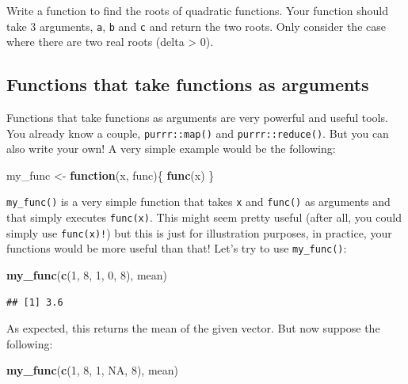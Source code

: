 \documentclass[]{gitbook}
\newenvironment{Shaded}{\begin{snugshade}}{\end{snugshade}}
\newcommand{\ControlFlowTok}[1]{\textcolor[rgb]{0.13,0.29,0.53}{\textbf{#1}}}
\newcommand{\DecValTok}[1]{\textcolor[rgb]{0.00,0.00,0.81}{#1}}
\newcommand{\KeywordTok}[1]{\textcolor[rgb]{0.13,0.29,0.53}{\textbf{#1}}}
\newcommand{\NormalTok}[1]{#1}
\newcommand{\OtherTok}[1]{\textcolor[rgb]{0.56,0.35,0.01}{#1}}
\newcommand{\StringTok}[1]{\textcolor[rgb]{0.31,0.60,0.02}{#1}}
\theoremstyle{definition}
\theoremstyle{definition}
\theoremstyle{definition}
\theoremstyle{remark}
\begin{document}
Write a function to find the roots of quadratic functions. Your function
should take 3 arguments, \texttt{a}, \texttt{b} and \texttt{c} and
return the two roots. Only consider the case where there are two real
roots (delta \textgreater{} 0).

\hypertarget{functions-that-take-functions-as-arguments}{%
\subsection{Functions that take functions as
arguments}\label{functions-that-take-functions-as-arguments}}

Functions that take functions as arguments are very powerful and useful
tools. You already know a couple, \texttt{purrr::map()} and
\texttt{purrr::reduce()}. But you can also write your own! A very simple
example would be the following:

\begin{Shaded}
\begin{Highlighting}[]
\NormalTok{my_func <-}\StringTok{ }\ControlFlowTok{function}\NormalTok{(x, func)\{}
  \KeywordTok{func}\NormalTok{(x)}
\NormalTok{\}}
\end{Highlighting}
\end{Shaded}

\texttt{my\_func()} is a very simple function that takes \texttt{x} and
\texttt{func()} as arguments and that simply executes \texttt{func(x)}.
This might seem pretty useful (after all, you could simply use
\texttt{func(x)!}) but this is just for illustration purposes, in
practice, your functions would be more useful than that! Let's try to
use \texttt{my\_func()}:

\begin{Shaded}
\begin{Highlighting}[]
\KeywordTok{my_func}\NormalTok{(}\KeywordTok{c}\NormalTok{(}\DecValTok{1}\NormalTok{, }\DecValTok{8}\NormalTok{, }\DecValTok{1}\NormalTok{, }\DecValTok{0}\NormalTok{, }\DecValTok{8}\NormalTok{), mean)}
\end{Highlighting}
\end{Shaded}

\begin{verbatim}
## [1] 3.6
\end{verbatim}

As expected, this returns the mean of the given vector. But now suppose
the following:

\begin{Shaded}
\begin{Highlighting}[]
\KeywordTok{my_func}\NormalTok{(}\KeywordTok{c}\NormalTok{(}\DecValTok{1}\NormalTok{, }\DecValTok{8}\NormalTok{, }\DecValTok{1}\NormalTok{, }\OtherTok{NA}\NormalTok{, }\DecValTok{8}\NormalTok{), mean)}
\end{Highlighting}
\end{Shaded}
\end{document}
